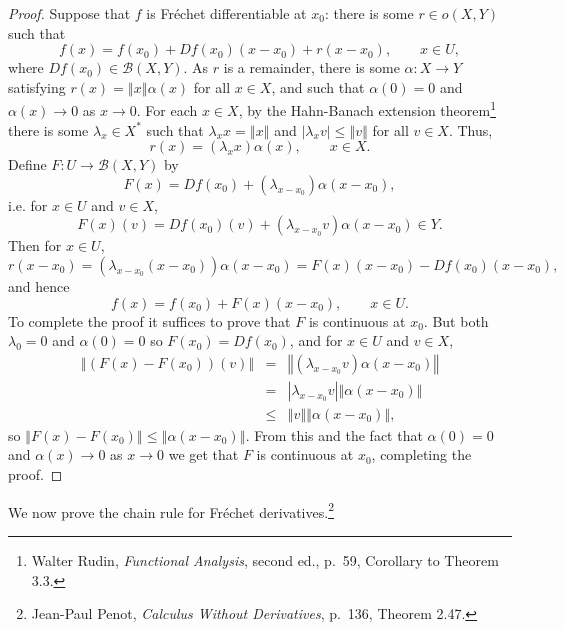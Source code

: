 \documentclass{article}
\newcommand{\norm}[1]{\left\Vert #1 \right\Vert}
\theoremstyle{definition}
\theoremstyle{definition}
\begin{document}
\begin{proof}
Suppose that $f$ is Fr\'echet differentiable at $x_0$: there is some $r \in o(X,Y)$ such that
\[
f(x)=f(x_0)+Df(x_0)(x-x_0)+r(x-x_0), \qquad x \in U,
\]
where $Df(x_0) \in \mathscr{B}(X,Y)$. As $r$ is a remainder, there is some
$\alpha:X \to Y$ satisfying $r(x)=\norm{x}\alpha(x)$ for all $x \in X$, and such that $\alpha(0)=0$ and $\alpha(x) \to 0$ 
as $x \to 0$.
For each $x \in X$, by the Hahn-Banach extension
theorem\footnote{Walter Rudin, {\em Functional Analysis}, second ed., p.~59, Corollary to Theorem 3.3.}
there is some $\lambda_x \in X^*$ such that $\lambda_x x = \norm{x}$ and $|\lambda_x v| \leq \norm{v}$ for all $v \in X$.
Thus,
\[
r(x)=(\lambda_x x)\alpha(x), \qquad x \in X.
\]
Define $F:U \to \mathscr{B}(X,Y)$ by
\[
F(x)=Df(x_0)+(\lambda_{x-x_0})\alpha(x-x_0),
\]
i.e. for $x \in U$ and $v \in X$,
\[
F(x)(v)=Df(x_0)(v)+(\lambda_{x-x_0} v) \alpha(x-x_0) \in Y.
\]
Then for $x \in U$,
\[
r(x-x_0)=(\lambda_{x-x_0}(x-x_0))\alpha(x-x_0)=F(x)(x-x_0)-Df(x_0)(x-x_0),
\]
and hence
\[
f(x)=f(x_0)+F(x)(x-x_0), \qquad x \in U.
\]
To complete the proof  it suffices to prove that $F$ is continuous at $x_0$. But both $\lambda_0=0$ and $\alpha(0)=0$ so
$F(x_0)=Df(x_0)$, and for  $x \in U$ and $v \in X$,
\begin{eqnarray*}
\norm{(F(x)-F(x_0))(v)}&=&\norm{(\lambda_{x-x_0}v)\alpha(x-x_0)}\\
&=&|\lambda_{x-x_0}v| \norm{\alpha(x-x_0)}\\
&\leq& \norm{v} \norm{\alpha(x-x_0)},
\end{eqnarray*}
so $\norm{F(x)-F(x_0)} \leq \norm{\alpha(x-x_0)}$. From this and the fact that $\alpha(0)=0$ and $\alpha(x) \to 0$ as $x \to 0$
we get that $F$ is continuous at $x_0$, completing the proof.
\end{proof}

We now prove the chain rule for Fr\'echet derivatives.\footnote{Jean-Paul Penot,
{\em Calculus Without Derivatives}, p.~136, Theorem 2.47.}
\end{document}
